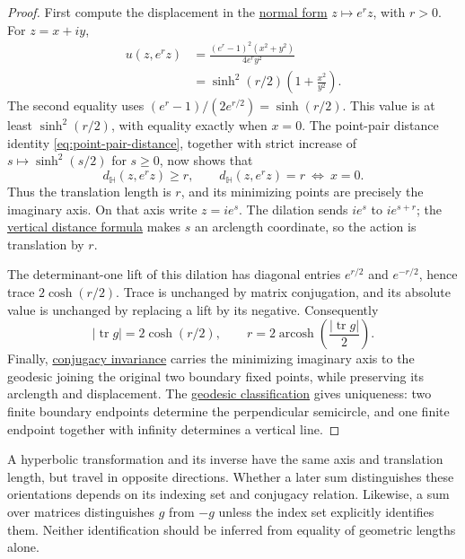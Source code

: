 \begin{proof}
First compute the displacement in the \hyperref[hyperbolic.hyperbolic-normal-form]{normal form} $z\mapsto e^r z$, with $r>0$. For $z=x+iy$,
\[
 \begin{aligned}
 u(z,e^r z)
 &=\frac{(e^r-1)^2(x^2+y^2)}{4e^r y^2}\\
 &=\sinh^2(r/2)\left(1+\frac{x^2}{y^2}\right).
 \end{aligned}
\]
The second equality uses $(e^r-1)/(2e^{r/2})=\sinh(r/2)$. This value is at least $\sinh^2(r/2)$, with equality exactly when $x=0$. The point-pair distance identity \eqref{eq:point-pair-distance}, together with strict increase of $s\mapsto\sinh^2(s/2)$ for $s\geq0$, now shows that
\[
 d_{\mathbb H}(z,e^r z)\geq r,
 \qquad d_{\mathbb H}(z,e^r z)=r\ \Longleftrightarrow\ x=0.
\]
Thus the translation length is $r$, and its minimizing points are precisely the imaginary axis. On that axis write $z=ie^s$. The dilation sends $ie^s$ to $ie^{s+r}$; the \hyperref[hyperbolic.vertical-geodesics]{vertical distance formula} makes $s$ an arclength coordinate, so the action is translation by $r$.

The determinant-one lift of this dilation has diagonal entries $e^{r/2}$ and $e^{-r/2}$, hence trace $2\cosh(r/2)$. Trace is unchanged by matrix conjugation, and its absolute value is unchanged by replacing a lift by its negative. Consequently
\[
 |\operatorname{tr}g|=2\cosh(r/2),
 \qquad r=2\operatorname{arcosh}\!\left(\frac{|\operatorname{tr}g|}{2}\right).
\]
Finally, \hyperref[hyperbolic.translation-length-conjugacy]{conjugacy invariance} carries the minimizing imaginary axis to the geodesic joining the original two boundary fixed points, while preserving its arclength and displacement. The \hyperref[hyperbolic.geodesics]{geodesic classification} gives uniqueness: two finite boundary endpoints determine the perpendicular semicircle, and one finite endpoint together with infinity determines a vertical line.
\end{proof}

\begin{remark}\label{hyperbolic.axis-orientation}
A hyperbolic transformation and its inverse have the same axis and translation length, but travel in opposite directions. Whether a later sum distinguishes these orientations depends on its indexing set and conjugacy relation. Likewise, a sum over matrices distinguishes $g$ from $-g$ unless the index set explicitly identifies them. Neither identification should be inferred from equality of geometric lengths alone.
\end{remark}
